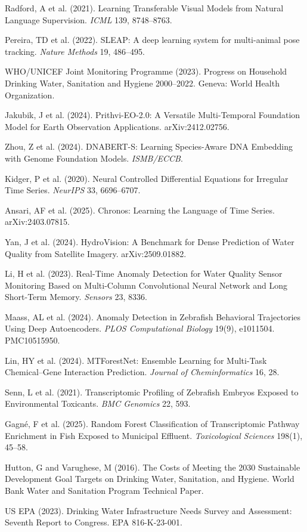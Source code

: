 \documentclass[12pt]{article}
\begin{document}
\begin{enumerate}[label={[\arabic*]}, nosep]
\item Radford, A et al. (2021). Learning Transferable Visual Models from Natural Language Supervision. \textit{ICML} 139, 8748--8763.
\item Pereira, TD et al. (2022). SLEAP: A deep learning system for multi-animal pose tracking. \textit{Nature Methods} 19, 486--495.
\item WHO/UNICEF Joint Monitoring Programme (2023). Progress on Household Drinking Water, Sanitation and Hygiene 2000--2022. Geneva: World Health Organization.
\item Jakubik, J et al. (2024). Prithvi-EO-2.0: A Versatile Multi-Temporal Foundation Model for Earth Observation Applications. arXiv:2412.02756.
\item Zhou, Z et al. (2024). DNABERT-S: Learning Species-Aware DNA Embedding with Genome Foundation Models. \textit{ISMB/ECCB}.
\item Kidger, P et al. (2020). Neural Controlled Differential Equations for Irregular Time Series. \textit{NeurIPS} 33, 6696--6707.
\item Ansari, AF et al. (2025). Chronos: Learning the Language of Time Series. arXiv:2403.07815.
\item Yan, J et al. (2024). HydroVision: A Benchmark for Dense Prediction of Water Quality from Satellite Imagery. arXiv:2509.01882.
\item Li, H et al. (2023). Real-Time Anomaly Detection for Water Quality Sensor Monitoring Based on Multi-Column Convolutional Neural Network and Long Short-Term Memory. \textit{Sensors} 23, 8336.
\item Maass, AL et al. (2024). Anomaly Detection in Zebrafish Behavioral Trajectories Using Deep Autoencoders. \textit{PLOS Computational Biology} 19(9), e1011504. PMC10515950.
\item Lin, HY et al. (2024). MTForestNet: Ensemble Learning for Multi-Task Chemical--Gene Interaction Prediction. \textit{Journal of Cheminformatics} 16, 28.
\item Senn, L et al. (2021). Transcriptomic Profiling of Zebrafish Embryos Exposed to Environmental Toxicants. \textit{BMC Genomics} 22, 593.
\item Gagn\'e, F et al. (2025). Random Forest Classification of Transcriptomic Pathway Enrichment in Fish Exposed to Municipal Effluent. \textit{Toxicological Sciences} 198(1), 45--58.
\item Hutton, G and Varughese, M (2016). The Costs of Meeting the 2030 Sustainable Development Goal Targets on Drinking Water, Sanitation, and Hygiene. World Bank Water and Sanitation Program Technical Paper.
\item US EPA (2023). Drinking Water Infrastructure Needs Survey and Assessment: Seventh Report to Congress. EPA 816-K-23-001.
\end{enumerate}
\end{document}
